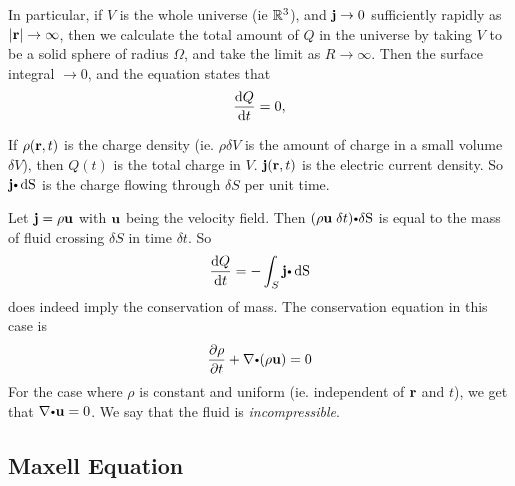 In particular, if $V$ is the whole universe (ie $\mathbb{R}^3$), and $\mathbf{ j}\to 0$ sufficiently rapidly as $|\mathbf{ r}| \to \infty$, then we calculate the total amount of $Q$ in the universe by taking $V$ to be a solid sphere of radius $\Omega$, and take the limit as $R\to \infty$. Then the surface integral $\to 0$, and the equation states that
\[
  \dfrac{\d Q}{\d t} = 0,
\]
\begin{exa}
  If $\rho(\mathbf{ r}, t)$ is the charge density (ie. $\rho\delta V$ is the amount of charge in a small volume $\delta V$), then $Q(t)$ is the total charge in $V$. $\mathbf{ j}(\mathbf{ r}, t)$ is the electric current density. So $\vector{j}\bp \d \S$ is the charge flowing through $\delta S$ per unit time.
\end{exa}

\begin{exa}
  Let $\mathbf{ j} = \rho \mathbf{ u}$ with $\mathbf{ u}$ being the velocity field. Then $(\rho\vector{u}\; \delta t)\bp \delta \S$ is equal to the mass of fluid crossing $\delta S$ in time $\delta t$. So
  \[
    \dfrac{\d Q}{\d t} = -\dint_S \vector{j}\bp \d \S
  \]
  does indeed imply the conservation of mass. The conservation equation in this case is
  \[
    \dfrac{\partial \rho}{\partial t} + \nabla\bp (\rho \vector{u}) = 0
  \]
  For the case where $\rho$ is constant and uniform (ie. independent of $\mathbf{ r}$ and $t$), we get that $\nabla\bp \vector{u} = 0$. We say that the fluid is \emph{incompressible}.
\end{exa}






  \subsection{Maxell Equation}

